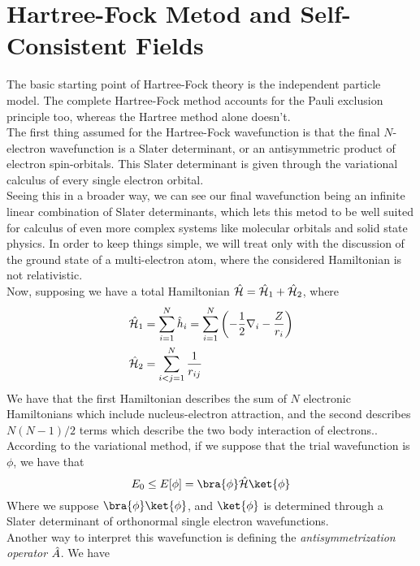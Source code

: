 \documentclass[../qm.tex]{subfiles}
\begin{document}
	\section{Hartree-Fock Metod and Self-Consistent Fields}
	The basic starting point of Hartree-Fock theory is the independent particle model. The complete Hartree-Fock method accounts for the Pauli exclusion principle too, whereas the Hartree method alone doesn't.\\
	The first thing assumed for the Hartree-Fock wavefunction is that the final $N$-electron wavefunction is a Slater determinant, or an antisymmetric product of electron spin-orbitals. This Slater determinant is given through the variational calculus of every single electron orbital.\\
	Seeing this in a broader way, we can see our final wavefunction being an infinite linear combination of Slater determinants, which lets this metod to be well suited for calculus of even more complex systems like molecular orbitals and solid state physics. In order to keep things simple, we will treat only with the discussion of the ground state of a multi-electron atom, where the considered Hamiltonian is not relativistic.\\
	Now, supposing we have a total Hamiltonian $\hat{\mathcal{H}}=\hat{\mathcal{H}}_1+\hat{\mathcal{H}}_2$, where
	\begin{equation}
		\begin{aligned}
			\hat{\mathcal{H}}_1&=\sum_{i=1}^N\hat{h}_i=\sum_{i=1}^N\left( -\frac{1}{2}\nabla_i-\frac{Z}{r_i} \right)\\
			\hat{\mathcal{H}}_2&=\sum_{i<j=1}^N\frac{1}{r_{ij}}
		\end{aligned}
		\label{eq:hartreefockbaseham}
	\end{equation}
	We have that the first Hamiltonian describes the sum of $N$ electronic Hamiltonians which include nucleus-electron attraction, and the second describes $N(N-1)/2$ terms which describe the two body interaction of electrons..\\
	According to the variational method, if we suppose that the trial wavefunction is $\phi$, we have that
	\begin{equation*}
		E_0\le E[\phi]=\bra{\phi}\opr{\ham}\ket{\phi}
	\end{equation*}
	Where we suppose $\bra{\phi}\ket{\phi}$, and $\ket{\phi}$ is determined through a Slater determinant of orthonormal single electron wavefunctions.\\
	Another way to interpret this wavefunction is defining the \textit{antisymmetrization operator} $\hat{A}$. We have
\end{document}
